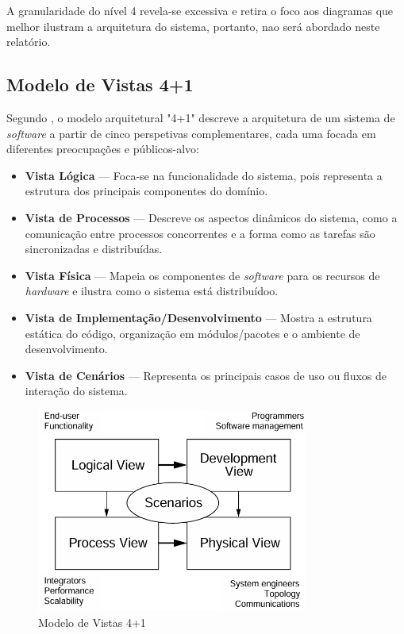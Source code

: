 A granularidade do nível 4 revela-se excessiva e retira o foco aos diagramas que melhor ilustram a arquitetura do sistema, portanto, nao será abordado neste relatório.

\subsection{Modelo de Vistas 4+1}
\label{subsec:model4plus1}

Segundo \cite{Kruchten1995}, o modelo arquitetural "4+1" descreve a arquitetura de um sistema de \textit{software} a partir de cinco perspetivas complementares, cada uma focada em diferentes preocupações e públicos-alvo:

\begin{itemize}
\item \textbf{Vista Lógica} — Foca-se na funcionalidade do sistema, pois representa a estrutura dos principais componentes do domínio.

\item \textbf{Vista de Processos} — Descreve os aspectos dinâmicos do sistema, como a comunicação entre processos concorrentes e a forma como as tarefas são sincronizadas e distribuídas.

\item \textbf{Vista Física} — Mapeia os componentes de \textit{software} para os recursos de \textit{hardware} e ilustra como o sistema está distribuídoo.

\item \textbf{Vista de Implementação/Desenvolvimento} — Mostra a estrutura estática do código, organização em módulos/pacotes e o ambiente de desenvolvimento.

\item \textbf{Vista de Cenários} — Representa os principais casos de uso ou fluxos de interação do sistema.
\end{itemize}

\begin{figure}[H]
    \centering
    \includegraphics[width=3.5in,keepaspectratio]{frontmatter/assets/diagrams/4+1views.png}
    \caption{Modelo de Vistas 4+1}
    \label{fig:41viewmodel}
\end{figure}


